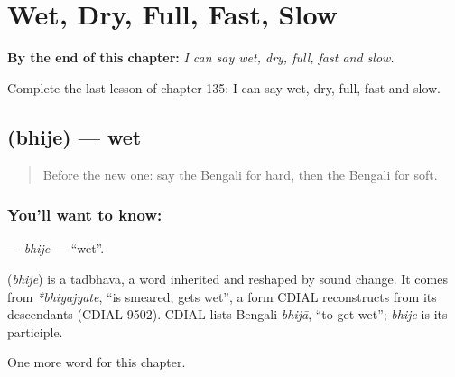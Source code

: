 
\chapter{Wet, Dry, Full, Fast, Slow}
\label{ch:bn-wet-dry-full-fast-slow}

\begin{chapteropening}
\textbf{By the end of this chapter:} \emph{I can say wet, dry, full, fast and slow.}

Complete the last lesson of chapter 135: I can say wet, dry, full, fast and slow.
\end{chapteropening}

\section[\texorpdfstring{\bn{ভিজে} (bhije)}{ভিজে (bhije)}]{ (bhije) — wet}

\label{lesson:BN-C135-bhije}



\begin{quote}
Before the new one: say the Bengali for hard, then the Bengali for soft.
\end{quote}

\subsection*{You'll want to know: }
\textbf{} — \emph{bhije} — \textquotedblleft{}wet\textquotedblright{}.

\begin{cousinweb}
\textbf{} (\emph{bhije}) is a tadbhava, a word inherited and reshaped by sound change. It comes from \emph{*bhiyajyate}, \textquotedblleft{}is smeared, gets wet\textquotedblright{}, a form CDIAL reconstructs from its descendants (CDIAL 9502). CDIAL lists Bengali \emph{bhijā}, \textquotedblleft{}to get wet\textquotedblright{}; \emph{bhije} is its participle.
\end{cousinweb}

\begin{grammarlens}[title={What you've built}]
One more word for this chapter.
\end{grammarlens}

